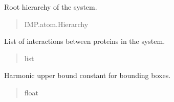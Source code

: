 \documentclass[letterpaper,10pt,english]{sphinxmanual}
\begin{document}
\begin{fulllineitems}
\begin{fulllineitems}
\begin{quote}
\begin{description}
\end{description}\end{quote}

\end{fulllineitems}


\begin{fulllineitems}
\label{\detokenize{src:src.System_Class.System.h_root}}
\pysigstartsignatures
{}
\pysigstopsignatures
\sphinxAtStartPar
Root hierarchy of the system.
\begin{quote}\begin{description}
\sphinxAtStartPar
IMP.atom.Hierarchy

\end{description}\end{quote}

\end{fulllineitems}


\begin{fulllineitems}
\label{\detokenize{src:src.System_Class.System.interactions}}
\pysigstartsignatures
{}
\pysigstopsignatures
\sphinxAtStartPar
List of interactions between proteins in the system.
\begin{quote}\begin{description}
\sphinxAtStartPar
list

\end{description}\end{quote}

\end{fulllineitems}


\begin{fulllineitems}
\label{\detokenize{src:src.System_Class.System.K_BB}}
\pysigstartsignatures
{}
\pysigstopsignatures
\sphinxAtStartPar
Harmonic upper bound constant for bounding boxes.
\begin{quote}\begin{description}
\sphinxAtStartPar
float


\end{description}
\end{quote}
\end{fulllineitems}
\end{fulllineitems}
\end{document}
